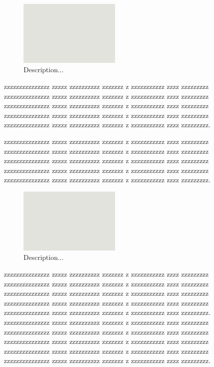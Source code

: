 \documentclass[prl,twocolumn]{revtex4-1}
\begin{document}
\begin{figure}[!tb]
  \includegraphics[width=0.44\textwidth]{fig1a.png}
  \caption{Description...}
  \label{fig:y}
\end{figure}

  zzzzzzzzzzzzzzz zzzzz zzzzzzzzzz zzzzzzz z zzzzzzzzzzz zzzz zzzzzzzzz
  zzzzzzzzzzzzzzz zzzzz zzzzzzzzzz zzzzzzz z zzzzzzzzzzz zzzz zzzzzzzzz
  zzzzzzzzzzzzzzz zzzzz zzzzzzzzzz zzzzzzz z zzzzzzzzzzz zzzz zzzzzzzzz
  zzzzzzzzzzzzzzz zzzzz zzzzzzzzzz zzzzzzz z zzzzzzzzzzz zzzz zzzzzzzzz
  zzzzzzzzzzzzzzz zzzzz zzzzzzzzzz zzzzzzz z zzzzzzzzzzz zzzz zzzzzzzzz.

  

  zzzzzzzzzzzzzzz zzzzz zzzzzzzzzz zzzzzzz z zzzzzzzzzzz zzzz zzzzzzzzz
  zzzzzzzzzzzzzzz zzzzz zzzzzzzzzz zzzzzzz z zzzzzzzzzzz zzzz zzzzzzzzz
  zzzzzzzzzzzzzzz zzzzz zzzzzzzzzz zzzzzzz z zzzzzzzzzzz zzzz zzzzzzzzz
  zzzzzzzzzzzzzzz zzzzz zzzzzzzzzz zzzzzzz z zzzzzzzzzzz zzzz zzzzzzzzz
  zzzzzzzzzzzzzzz zzzzz zzzzzzzzzz zzzzzzz z zzzzzzzzzzz zzzz zzzzzzzzz.
  
\begin{figure}[!tb]
  \includegraphics[width=0.44\textwidth]{fig1a.png}
  \caption{Description...}
  \label{fig:z}
\end{figure}


  zzzzzzzzzzzzzzz zzzzz zzzzzzzzzz zzzzzzz z zzzzzzzzzzz zzzz zzzzzzzzz
  zzzzzzzzzzzzzzz zzzzz zzzzzzzzzz zzzzzzz z zzzzzzzzzzz zzzz zzzzzzzzz
  zzzzzzzzzzzzzzz zzzzz zzzzzzzzzz zzzzzzz z zzzzzzzzzzz zzzz zzzzzzzzz
  zzzzzzzzzzzzzzz zzzzz zzzzzzzzzz zzzzzzz z zzzzzzzzzzz zzzz zzzzzzzzz
  zzzzzzzzzzzzzzz zzzzz zzzzzzzzzz zzzzzzz z zzzzzzzzzzz zzzz zzzzzzzzz.
  zzzzzzzzzzzzzzz zzzzz zzzzzzzzzz zzzzzzz z zzzzzzzzzzz zzzz zzzzzzzzz
  zzzzzzzzzzzzzzz zzzzz zzzzzzzzzz zzzzzzz z zzzzzzzzzzz zzzz zzzzzzzzz
  zzzzzzzzzzzzzzz zzzzz zzzzzzzzzz zzzzzzz z zzzzzzzzzzz zzzz zzzzzzzzz
  zzzzzzzzzzzzzzz zzzzz zzzzzzzzzz zzzzzzz z zzzzzzzzzzz zzzz zzzzzzzzz
  zzzzzzzzzzzzzzz zzzzz zzzzzzzzzz zzzzzzz z zzzzzzzzzzz zzzz zzzzzzzzz.
  
\end{document}
